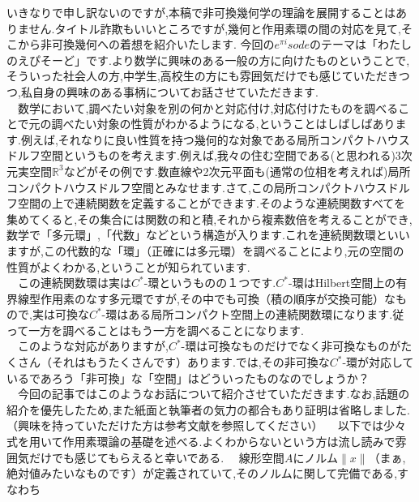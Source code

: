 
いきなりで申し訳ないのですが,本稿で非可換幾何学の理論を展開することはありません.タイトル詐欺もいいところですが,幾何と作用素環の間の対応を見て,そこから非可換幾何への着想を紹介いたします.
今回の$e^{\pi i}sode$のテーマは「わたしのえぴそーど」です.より数学に興味のある一般の方に向けたものということで,そういった社会人の方,中学生,高校生の方にも雰囲気だけでも感じていただきつつ,私自身の興味のある事柄についてお話させていただきます.\\
　数学において,調べたい対象を別の何かと対応付け,対応付けたものを調べることで元の調べたい対象の性質がわかるようになる,ということはしばしばあります.例えば,それなりに良い性質を持つ幾何的な対象である局所コンパクトハウスドルフ空間というものを考えます.例えば,我々の住む空間である(と思われる)3次元実空間$\mathbb{R}^3$などがその例です.数直線や2次元平面も(通常の位相を考えれば)局所コンパクトハウスドルフ空間とみなせます.さて,この局所コンパクトハウスドルフ空間の上で連続関数を定義することができます.そのような連続関数すべてを集めてくると,その集合には関数の和と積,それから複素数倍を考えることができ,数学で「多元環」,「代数」などという構造が入ります.これを連続関数環といいますが,この代数的な「環」（正確には多元環）を調べることにより,元の空間の性質がよくわかる,ということが知られています.\\
　この連続関数環は実は$C^*$-環というものの１つです.$C^*$-環はHilbert空間上の有界線型作用素のなす多元環ですが,その中でも可換（積の順序が交換可能）なもので,実は可換な$C^*$-環はある局所コンパクト空間上の連続関数環になります.従って一方を調べることはもう一方を調べることになります.\\
　このような対応がありますが,$C^*$-環は可換なものだけでなく非可換なものがたくさん（それはもうたくさんです）あります.では,その非可換な$C^*$-環が対応しているであろう「非可換」な「空間」はどういったものなのでしょうか？\\
　今回の記事ではこのようなお話について紹介させていただきます.なお,話題の紹介を優先したため,また紙面と執筆者の気力の都合もあり証明は省略しました.（興味を持っていただけた方は参考文献を参照してください）
　以下では少々式を用いて作用素環論の基礎を述べる.よくわからないという方は流し読みで雰囲気だけでも感じてもらえると幸いである.
　線形空間$A$にノルム$\parallel x\parallel$（まぁ,絶対値みたいなものです）が定義されていて,そのノルムに関して完備である,すなわち
